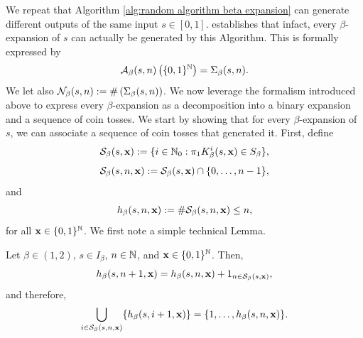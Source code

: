 We repeat that Algorithm \ref{alg:random algorithm beta expansion} can generate different outputs of the same input $s \in [0,1]$. \cite[Theorem 1]{dajani2007invariant} establishes that infact, every $\beta$-expansion of $s$ can actually be generated by this Algorithm. This is formally expressed by 
\begin{equation}
    \mathcal{A}_\beta(s,n) \left( \{0,1\}^{\mathbb{N}}\right) = \Sigma_\beta(s,n).
\end{equation}
We let also $\mathcal{N}_\beta(s,n) :=  \# \left(\Sigma_\beta(s,n) \right)$.
We now leverage the formalism introduced above to express every $\beta$-expansion as a decomposition into a binary expansion and a sequence of coin tosses. We start by showing that for every $\beta$-expansion of $s$, we can associate a sequence of coin tosses that generated it. First, define
\begin{equation}
    \mathcal{S}_\beta(s,{\bf x}) := \{i \in \mathbb{N}_0 : \pi_1 K_\beta^i(s,{\bf x}) \in S_\beta\},
\end{equation}
\begin{equation}
    \mathcal{S}_\beta(s,n,{\bf x}) := \mathcal{S}_\beta(s,{\bf x}) \cap \{0,\ldots,n-1\},
\end{equation} 
and
\begin{equation}
    h_\beta(s,n,{\bf x}) := \# \mathcal{S}_\beta(s,n,{\bf x}) \leq n,
\end{equation}
for all ${\bf x} \in \{0,1\}^{\mathbb{N}}$. We first note a simple technical Lemma.
\begin{lemma}\label{lem:recursive relation for determining h beta}
    Let $\beta \in (1,2)$, $s \in I_\beta$, $n \in \mathbb{N}$, and ${\bf x} \in \{0,1\}^{\mathbb{N}}$. Then,
    \begin{equation}\label{eq:main1:lem:recursive relation for determining h beta}
        h_\beta(s,n+1,{\bf x}) = h_\beta(s,n, {\bf x}) + 1_{n \in \mathcal{S}_\beta(s,{\bf x})},
    \end{equation}
    and therefore,
    \begin{equation}\label{eq:main2:lem:recursive relation for determining h beta}
        \bigcup_{i \in \mathcal{S}_\beta(s,n,{\bf x})} \{h_\beta(s,i+1,{\bf x})\} = \{1, \ldots, h_\beta(s,n,{\bf x})\}.
    \end{equation}
\end{lemma}
